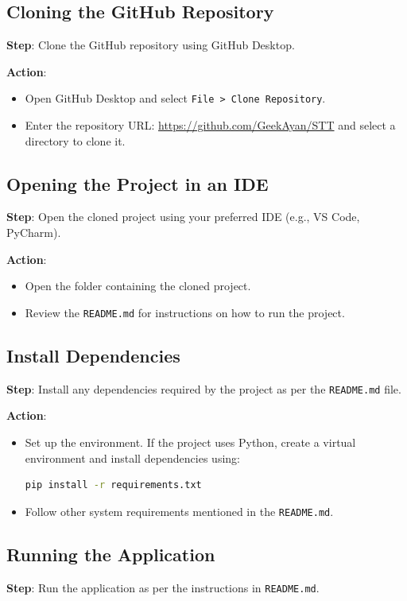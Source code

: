 \documentclass{article}
\begin{document}
\subsection{Cloning the GitHub Repository}
\textbf{Step}: Clone the GitHub repository using GitHub Desktop.

\textbf{Action}:
\begin{itemize}
    \item Open GitHub Desktop and select \texttt{File > Clone Repository}.
    \item Enter the repository URL: \url{https://github.com/GeekAyan/STT} and select a directory to clone it.
\end{itemize}

\subsection{Opening the Project in an IDE}
\textbf{Step}: Open the cloned project using your preferred IDE (e.g., VS Code, PyCharm).

\textbf{Action}:
\begin{itemize}
    \item Open the folder containing the cloned project.
    \item Review the \texttt{README.md} for instructions on how to run the project.
\end{itemize}

\subsection{Install Dependencies}
\textbf{Step}: Install any dependencies required by the project as per the \texttt{README.md} file.

\textbf{Action}:
\begin{itemize}
    \item Set up the environment. If the project uses Python, create a virtual environment and install dependencies using:
    \begin{lstlisting}[language=bash]
    pip install -r requirements.txt
    \end{lstlisting}
    \item Follow other system requirements mentioned in the \texttt{README.md}.
\end{itemize}

\subsection{Running the Application}
\textbf{Step}: Run the application as per the instructions in \texttt{README.md}.
\end{document}
